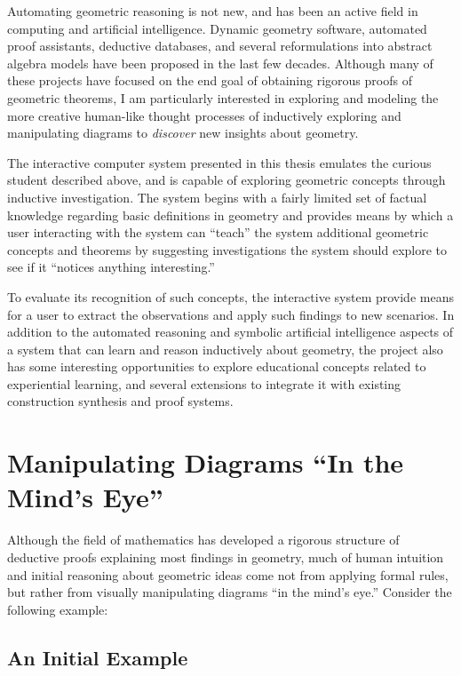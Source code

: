 Automating geometric reasoning is not new, and has been an active
field in computing and artificial intelligence.  Dynamic geometry
software, automated proof assistants, deductive databases, and several
reformulations into abstract algebra models have been proposed in the
last few decades.  Although many of these projects have focused on the
end goal of obtaining rigorous proofs of geometric theorems, I am
particularly interested in exploring and modeling the more creative
human-like thought processes of inductively exploring and manipulating
diagrams to \emph{discover} new insights about geometry.

The interactive computer system presented in this thesis emulates the
curious student described above, and is capable of exploring geometric
concepts through inductive investigation.  The system begins with a
fairly limited set of factual knowledge regarding basic definitions in
geometry and provides means by which a user interacting with the
system can ``teach'' the system additional geometric concepts and
theorems by suggesting investigations the system should explore to see
if it ``notices anything interesting.''

To evaluate its recognition of such concepts, the interactive system
provide means for a user to extract the observations and apply such
findings to new scenarios.  In addition to the automated reasoning and
symbolic artificial intelligence aspects of a system that can learn
and reason inductively about geometry, the project also has some
interesting opportunities to explore educational concepts related to
experiential learning, and several extensions to integrate it with
existing construction synthesis and proof systems.

\section{Manipulating Diagrams ``In the Mind's Eye''}

Although the field of mathematics has developed a rigorous structure
of deductive proofs explaining most findings in geometry, much of
human intuition and initial reasoning about geometric ideas come not
from applying formal rules, but rather from visually manipulating
diagrams ``in the mind's eye.'' Consider the following example:

\subsection{An Initial Example}

